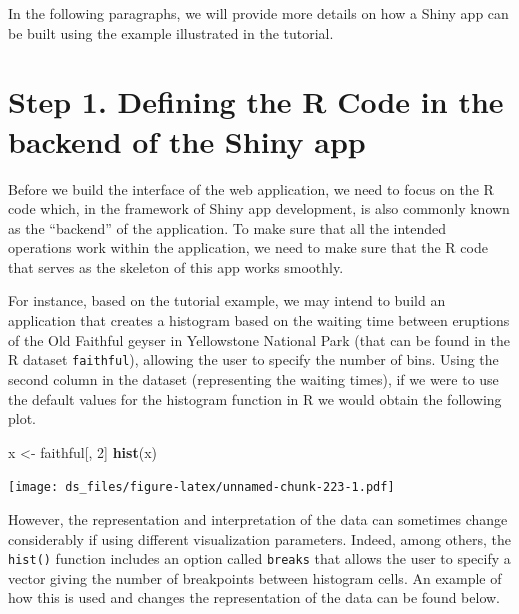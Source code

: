 \documentclass[12pt,]{krantz}
\newenvironment{Shaded}{\begin{snugshade}}{\end{snugshade}}
\newcommand{\KeywordTok}[1]{\textcolor[rgb]{0.27,0.27,0.27}{\textbf{#1}}}
\newcommand{\DecValTok}[1]{\textcolor[rgb]{0.06,0.06,0.06}{#1}}
\newcommand{\StringTok}[1]{\textcolor[rgb]{0.5,0.5,0.5}{#1}}
\newcommand{\NormalTok}[1]{#1}
\begin{document}
In the following paragraphs, we will provide more details on how a Shiny
app can be built using the example illustrated in the tutorial.

\section{Step 1. Defining the R Code in the backend of the Shiny
app}\label{step-1.-defining-the-r-code-in-the-backend-of-the-shiny-app}

Before we build the interface of the web application, we need to focus
on the R code which, in the framework of Shiny app development, is also
commonly known as the ``backend'' of the application. To make sure that
all the intended operations work within the application, we need to make
sure that the R code that serves as the skeleton of this app works
smoothly.

For instance, based on the tutorial example, we may intend to build an
application that creates a histogram based on the waiting time between
eruptions of the Old Faithful geyser in Yellowstone National Park (that
can be found in the R dataset \texttt{faithful}), allowing the user to
specify the number of bins. Using the second column in the dataset
(representing the waiting times), if we were to use the default values
for the histogram function in R we would obtain the following plot.

\begin{Shaded}
\begin{Highlighting}[]
\NormalTok{x <-}\StringTok{ }\NormalTok{faithful[, }\DecValTok{2}\NormalTok{] }
\KeywordTok{hist}\NormalTok{(x)}
\end{Highlighting}
\end{Shaded}

\texttt{[image: ds\_files/figure-latex/unnamed-chunk-223-1.pdf]}

However, the representation and interpretation of the data can sometimes
change considerably if using different visualization parameters. Indeed,
among others, the \texttt{hist()} function includes an option called
\texttt{breaks} that allows the user to specify a vector giving the
number of breakpoints between histogram cells. An example of how this is
used and changes the representation of the data can be found below.
\end{document}
